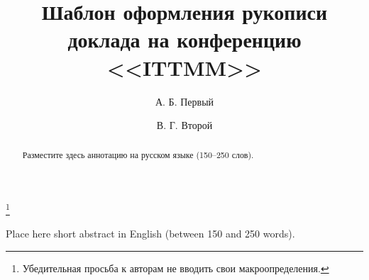 \documentclass[60x84/16,8pt]{ittmm}
\begin{document}

\title{Шаблон оформления рукописи доклада
  на конференцию <<ITTMM>>}

\author[1,2]{А. Б. Первый}
\author[1]{В. Г. Второй}

\address[1]{Кафедра прикладной информатики и теории вероятностей,\\
  Российский университет дружбы народов,\\
  ул. Миклухо-Маклая, д.6, Москва, Россия, 117198}
\address[2]{Лаборатория информационных технологий,\\
Объединённый институт ядерных исследований,\\
ул. Жолио-Кюри 6, Дубна, Московская область, Россия, 141980}


\begin{abstract}
Разместите здесь аннотацию на русском языке (150--250 слов).
\end{abstract}


\thanks{Убедительная просьба к авторам не вводить свои макроопределения.}





\begin{altabstract}
Place here short abstract in English (between 150 and 250 words).
\end{altabstract}

\end{document}
